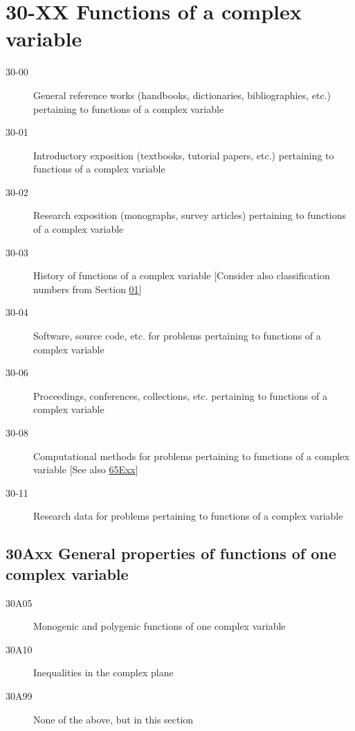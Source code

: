 \section*{30-XX Functions of a complex variable }\label{30-XX}
\begin{description}
\item [30-00]\label{30-00} General reference works (handbooks, dictionaries, bibliographies, etc.) pertaining to functions of a complex variable
\item [30-01]\label{30-01} Introductory exposition (textbooks, tutorial papers, etc.) pertaining to functions of a complex variable
\item [30-02]\label{30-02} Research exposition (monographs, survey articles) pertaining to functions of a complex variable
\item [30-03]\label{30-03} History of functions of a complex variable [Consider also classification numbers from Section \hyperref[01-XX]{01}]
\item [30-04]\label{30-04} Software, source code, etc. for problems pertaining to functions of a complex variable
\item [30-06]\label{30-06} Proceedings, conferences, collections, etc. pertaining to functions of a complex variable
\item [30-08]\label{30-08} Computational methods for problems pertaining to functions of a complex variable [See also \hyperref[65Exx]{65Exx}]
\item [30-11]\label{30-11} Research data for problems pertaining to functions of a complex variable
\end{description}
\subsection*{30Axx  General properties of functions of one complex variable}\label{30Axx}
\begin{description}  
\item [30A05]\label{30A05} Monogenic and polygenic functions of one complex variable
\item [30A10]\label{30A10} Inequalities in the complex plane 
\item [30A99]\label{30A99} None of the above, but in this section
\end{description}
